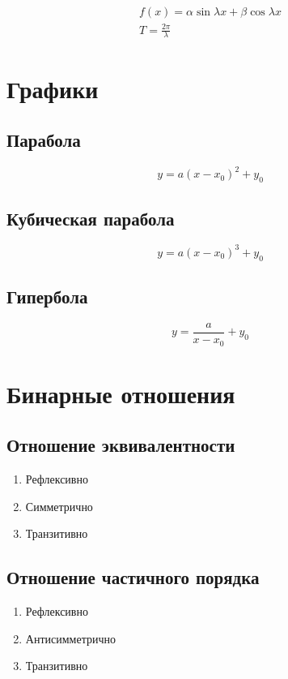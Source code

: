 \documentclass{article}
\begin{document}
\begin{gather*}
	f(x) = \alpha \sin{\lambda x} + \beta \cos{\lambda x} \\
	T = \frac{2\pi}{\lambda}
\end{gather*} 


\section{Графики}

\subsection{Парабола}

\[ y = a(x - x_0)^2 + y_0 \]

\subsection{Кубическая парабола}

\[ y = a(x - x_0)^3 + y_0 \]

\subsection{Гипербола}

\[ y = \frac{a}{x - x_0} + y_0 \]

\pagebreak
\section{Бинарные отношения}

\subsection{Отношение эквивалентности}

\begin{enumerate}
	\item Рефлексивно
	\item Симметрично
	\item Транзитивно
\end{enumerate}

\subsection{Отношение частичного порядка}

\begin{enumerate}
	\item Рефлексивно
	\item Антисимметрично
	\item Транзитивно
\end{enumerate}
\end{document}
